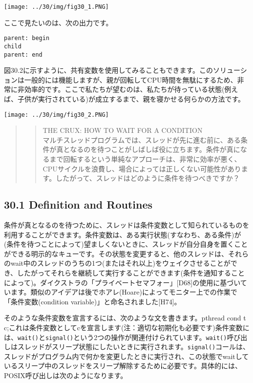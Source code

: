 \texttt{[image: ../30/img/fig30\_1.PNG]}

ここで見たいのは、次の出力です。

\begin{verbatim}
parent: begin
child
parent: end
\end{verbatim}

図30.2に示すように、共有変数を使用してみることもできます。このソリューションは一般的には機能しますが、親が回転してCPU時間を無駄にするため、非常に非効率的です。ここで私たちが望むのは、私たちが待っている状態(例えば、子供が実行されている)が成立するまで、親を寝かせる何らかの方法です。

\texttt{[image: ../30/img/fig30\_2.PNG]}

\begin{quote}
\begin{quote}
THE CRUX: HOW TO WAIT FOR A CONDITION\\
マルチスレッドプログラムでは、スレッドが先に進む前に、ある条件が真となるのを待つことがしばしば役に立ちます。条件が真になるまで回転するという単純なアプローチは、非常に効率が悪く、CPUサイクルを浪費し、場合によっては正しくない可能性があります。したがって、スレッドはどのように条件を待つべきですか？
\end{quote}
\end{quote}

\hypertarget{definition-and-routines}{%
\subsection*{30.1 Definition and
Routines}\label{definition-and-routines}}

条件が真となるのを待つために、スレッドは条件変数として知られているものを利用することができます。条件変数は、ある実行状態(すなわち、ある条件)が(条件を待つことによって)望ましくないときに、スレッドが自分自身を置くことができる明示的なキューです。その状態を変更すると、他のスレッドは、それらのwait中のスレッドのうちの1つ(またはそれ以上)をウェイクさせることができ、したがってそれらを継続して実行することができます(条件を通知することによって)。ダイクストラの「プライベートセマフォー」{[}D68{]}の使用に基づいています。類似のアイデアは後でホアレ(Hoare)によってモニター上での作業で「条件変数(condition
variable)」と命名されました{[}H74{]}。

そのような条件変数を宣言するには、次のような文を書きます。pthread cond t
c;これは条件変数としてcを宣言します(注：適切な初期化も必要です)条件変数には、\texttt{wait()}と\texttt{signal()}という2つの操作が関連付けられています。\texttt{wait()}呼び出しはスレッドがスリープ状態にしたいときに実行されます。\texttt{signal()}コールは、スレッドがプログラム内で何かを変更したときに実行され、この状態でwaitしているスリープ中のスレッドをスリープ解除するために必要です。具体的には、POSIX呼び出しは次のようになります。


